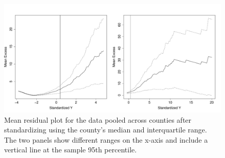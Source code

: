 \begin{figure}[htbp]  %
  \centering
  \includegraphics[width = \linewidth]{plots/fire-mrl-plots.pdf}
  \caption{Mean residual plot for the data pooled across counties after standardizing using the county's median and interquartile range. The two panels show different ranges on the x-axis and include a vertical line at the sample 95th percentile.}
  \label{ebfig:mrlthresh}
\end{figure}


